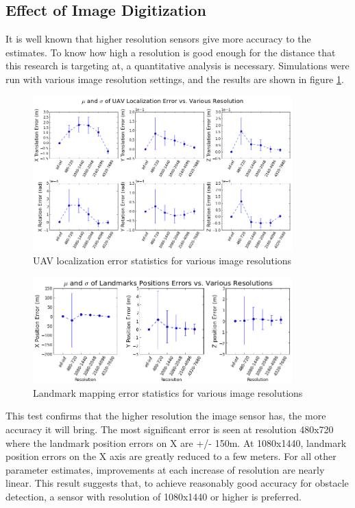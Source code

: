 \subsection{Effect of Image Digitization}

It is well known that higher resolution sensors give more accuracy
to the estimates. To know how high a resolution is good enough for the
distance that this research is targeting at, a quantitative
analysis is necessary. Simulations were run with various image
resolution settings, and the results are shown in figure
\ref{fig:simfig50}.
\begin{figure}[h] 
  \centering
  \includegraphics[width=10cm,keepaspectratio=true]{./Figures/SimulationFigures/Figure50.png}
  \caption{UAV localization error statistics for various image resolutions}
  \label{fig:simfig50}
\end{figure}

\begin{figure}[h] 
  \centering
  \includegraphics[width=10cm,keepaspectratio=true]{./Figures/SimulationFigures/Figure49.png}
  \caption{Landmark mapping error statistics for various image resolutions}
  \label{fig:simfig51}
\end{figure}

This test confirms that the higher resolution the image sensor has,
the more accuracy it will bring. The most significant error is seen
at resolution 480x720 where the landmark position errors on X are
+/- 150m. At 1080x1440, landmark position errors on the X axis are
greatly reduced to a few meters. For all other parameter estimates,
improvements at each increase of resolution are nearly linear.
This result suggests that, to achieve reasonably good accuracy for
obstacle detection, a sensor with resolution of 1080x1440 or higher is
preferred.


